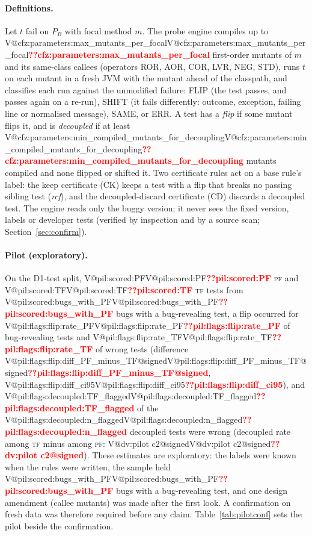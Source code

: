 \documentclass[pdflatex,iicol,sn-mathphys-num]{sn-jnl}
\makeatletter
\newcommand{\V}[1]{\ifcsname V@#1\endcsname\csname V@#1\endcsname\else\textbf{\textcolor{red}{??#1}}\fi}
\newcommand{\PF}{\textsc{pf}}
\newcommand{\TF}{\textsc{tf}}
\makeatother
\begin{document}
\paragraph{Definitions.} Let $t$ fail on $P_B$ with focal method $m$. The probe engine compiles up to \V{cfz:parameters:max_mutants_per_focal} first-order mutants of $m$ and its same-class callees (operators ROR, AOR, COR, LVR, NEG, STD), runs $t$ on each mutant in a fresh JVM with the mutant ahead of the classpath, and classifies each run against the unmodified failure: FLIP (the test passes, and passes again on a re-run), SHIFT (it fails differently: outcome, exception, failing line or normalised message), SAME, or ERR. A test has a \emph{flip} if some mutant flips it, and is \emph{decoupled} if at least \V{cfz:parameters:min_compiled_mutants_for_decoupling} mutants compiled and none flipped or shifted it. Two certificate rules act on a base rule's label: the keep certificate (CK) keeps a test with a flip that breaks no passing sibling test (\emph{rcf}), and the decoupled-discard certificate (CD) discards a decoupled test. The engine reads only the buggy version; it never sees the fixed version, labels or developer tests (verified by inspection and by a source scan; Section~\ref{sec:confirm}).

\paragraph{Pilot (exploratory).} On the D1-test split, \V{pil:scored:PF} \PF{} and \V{pil:scored:TF} \TF{} tests from \V{pil:scored:bugs_with_PF} bugs with a bug-revealing test, a flip occurred for \V{pil:flags:flip:rate_PF} of bug-revealing tests and \V{pil:flags:flip:rate_TF} of wrong tests (difference \V{pil:flags:flip:diff_PF_minus_TF@signed}, \V{pil:flags:flip:diff_ci95}), and \V{pil:flags:decoupled:TF_flagged} of the \V{pil:flags:decoupled:n_flagged} decoupled tests were wrong (decoupled rate among \TF{} minus among \PF{}: \V{dv:pilot c2@signed}). These estimates are exploratory: the labels were known when the rules were written, the sample held \V{pil:scored:bugs_with_PF} bugs with a bug-revealing test, and one design amendment (callee mutants) was made after the first look. A confirmation on fresh data was therefore required before any claim. Table~\ref{tab:pilotconf} sets the pilot beside the confirmation.
\end{document}
